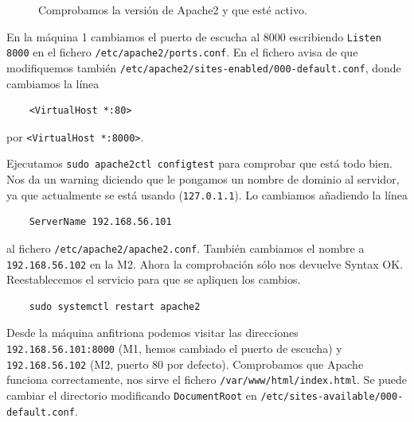 \documentclass{article}
\begin{document}
\begin{figure}[H]
	\centering
	\caption{Comprobamos la versión de Apache2 y que esté activo.}
	\label{fig:apache2}
\end{figure}

En la máquina 1 cambiamos el puerto de escucha al 8000 escribiendo \texttt{Listen 8000} en el fichero \texttt{/etc/apache2/ports.conf}.
En el fichero avisa de que modifiquemos también \texttt{/etc/apache2/sites-enabled/000-default.conf}, donde cambiamos la línea
\begin{verbatim}
	<VirtualHost *:80>
\end{verbatim}
por \texttt{<VirtualHost *:8000>}.

Ejecutamos \texttt{sudo apache2ctl configtest} para comprobar que está todo bien. Nos da un warning diciendo que le pongamos un
nombre de dominio al servidor, ya que actualmente se está usando (\texttt{127.0.1.1}). Lo cambiamos añadiendo la línea
\begin{verbatim}
	ServerName 192.168.56.101
\end{verbatim}
al fichero \texttt{/etc/apache2/apache2.conf}. También cambiamos el nombre a
\texttt{192.168.56.102} en la M2. Ahora la comprobación sólo nos devuelve Syntax OK.
 Reestablecemos el servicio para que se apliquen los cambios.

\begin{verbatim}
	sudo systemctl restart apache2
\end{verbatim}

Desde la máquina anfitriona podemos visitar las direcciones \texttt{192.168.56.101:8000} (M1, hemos cambiado el puerto de escucha)
 y \texttt{192.168.56.102} (M2, puerto 80 por defecto). Comprobamos que Apache funciona correctamente, nos sirve el fichero
 \texttt{/var/www/html/index.html}. Se puede cambiar el directorio modificando \texttt{DocumentRoot} en 
 \texttt{/etc/sites-available/000-default.conf}.
 
\end{document}
